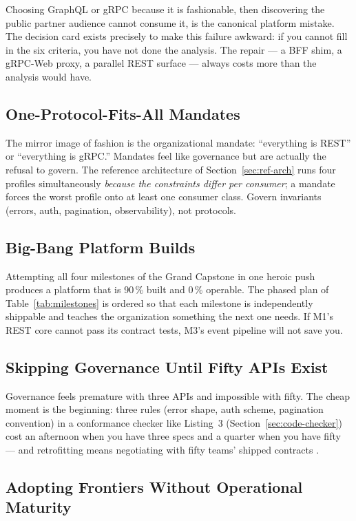 Choosing GraphQL or gRPC because it is fashionable, then discovering the
public partner audience cannot consume it, is the canonical platform mistake.
The decision card exists precisely to make this failure awkward: if you
cannot fill in the six criteria, you have not done the analysis. The repair
--- a BFF shim, a gRPC-Web proxy, a parallel REST surface --- always costs
more than the analysis would have.

\subsection{One-Protocol-Fits-All Mandates}

The mirror image of fashion is the organizational mandate: ``everything is
REST'' or ``everything is gRPC.'' Mandates feel like governance but are
actually the refusal to govern. The reference architecture of
Section~\ref{sec:ref-arch} runs four profiles simultaneously \emph{because
the constraints differ per consumer}; a mandate forces the worst profile onto
at least one consumer class. Govern invariants (errors, auth, pagination,
observability), not protocols.

\subsection{Big-Bang Platform Builds}

Attempting all four milestones of the Grand Capstone in one heroic push
produces a platform that is 90\,\% built and 0\,\% operable. The phased plan
of Table~\ref{tab:milestones} is ordered so that each milestone is
independently shippable and teaches the organization something the next one
needs. If M1's REST core cannot pass its contract tests, M3's event pipeline
will not save you.

\subsection{Skipping Governance Until Fifty APIs Exist}

Governance feels premature with three APIs and impossible with fifty. The
cheap moment is the beginning: three rules (error shape, auth scheme,
pagination convention) in a conformance checker like
Listing~3 (Section~\ref{sec:code-checker}) cost an afternoon when you have three specs and a
quarter when you have fifty --- and retrofitting means negotiating with fifty
teams' shipped contracts \cite{gehl2021apidesign}.

\subsection{Adopting Frontiers Without Operational Maturity}


